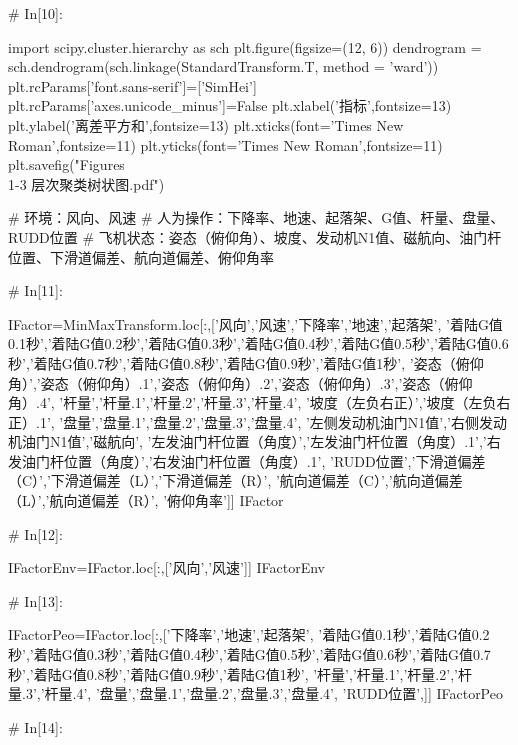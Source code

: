 \documentclass{MathorCupModeling}
\begin{document}
\begin{python}
# In[10]:


import scipy.cluster.hierarchy as sch
plt.figure(figsize=(12, 6))
dendrogram = sch.dendrogram(sch.linkage(StandardTransform.T, method = 'ward'))
plt.rcParams['font.sans-serif']=['SimHei']
plt.rcParams['axes.unicode_minus']=False
plt.xlabel('指标',fontsize=13)
plt.ylabel('离差平方和',fontsize=13)
plt.xticks(font='Times New Roman',fontsize=11)
plt.yticks(font='Times New Roman',fontsize=11)
plt.savefig("Figures\\1-3 层次聚类树状图.pdf")


# 环境：风向、风速
# 人为操作：下降率、地速、起落架、G值、杆量、盘量、RUDD位置
# 飞机状态：姿态（俯仰角）、坡度、发动机N1值、磁航向、油门杆位置、下滑道偏差、航向道偏差、俯仰角率

# In[11]:


IFactor=MinMaxTransform.loc[:,['风向','风速','下降率','地速','起落架',
                               '着陆G值0.1秒','着陆G值0.2秒','着陆G值0.3秒','着陆G值0.4秒','着陆G值0.5秒','着陆G值0.6秒','着陆G值0.7秒','着陆G值0.8秒','着陆G值0.9秒','着陆G值1秒',
                               '姿态（俯仰角）','姿态（俯仰角）.1','姿态（俯仰角）.2','姿态（俯仰角）.3','姿态（俯仰角）.4',
                               '杆量','杆量.1','杆量.2','杆量.3','杆量.4',
                               '坡度（左负右正）','坡度（左负右正）.1',
                               '盘量','盘量.1','盘量.2','盘量.3','盘量.4',
                               '左侧发动机油门N1值','右侧发动机油门N1值','磁航向',
                               '左发油门杆位置（角度）','左发油门杆位置（角度）.1','右发油门杆位置（角度）','右发油门杆位置（角度）.1',
                               'RUDD位置','下滑道偏差（C）','下滑道偏差（L）','下滑道偏差（R）',
                               '航向道偏差（C）','航向道偏差（L）','航向道偏差（R）',
                               '俯仰角率']]
IFactor


# In[12]:


IFactorEnv=IFactor.loc[:,['风向','风速']]
IFactorEnv


# In[13]:


IFactorPeo=IFactor.loc[:,['下降率','地速','起落架',
                          '着陆G值0.1秒','着陆G值0.2秒','着陆G值0.3秒','着陆G值0.4秒','着陆G值0.5秒','着陆G值0.6秒','着陆G值0.7秒','着陆G值0.8秒','着陆G值0.9秒','着陆G值1秒',
                          '杆量','杆量.1','杆量.2','杆量.3','杆量.4',
                          '盘量','盘量.1','盘量.2','盘量.3','盘量.4',
                          'RUDD位置',]]
IFactorPeo


# In[14]:



\end{python}
\end{document}
